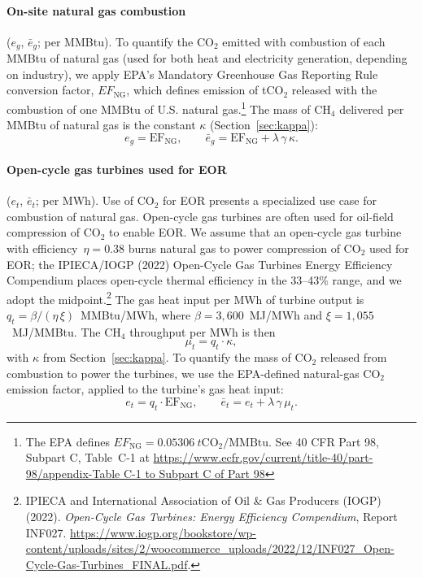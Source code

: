 \documentclass[11pt]{article}
\newcommand{\cotwo}{\ensuremath{\mathrm{CO_2}}}
\newcommand{\chfour}{\ensuremath{\mathrm{CH_4}}}
\begin{document}
\paragraph{On-site natural gas combustion} ($e_g$, $\bar{e}_g$; per MMBtu).
To quantify the \cotwo{} emitted with combustion of each MMBtu of natural gas (used for both heat and electricity generation, depending on industry), we apply EPA's Mandatory Greenhouse Gas Reporting Rule conversion factor, $EF_\text{NG}$, which defines emission of t\cotwo{} released with the combustion of one MMBtu of U.S. natural gas.\footnote{The EPA defines $EF_\text{NG}=0.05306~t\cotwo{}/\text{MMBtu}$. See 40 CFR Part 98, Subpart C, Table~C-1 at \url{https://www.ecfr.gov/current/title-40/part-98/appendix-Table C-1 to Subpart C of Part 98}} The mass of \chfour{} delivered per MMBtu of natural gas is the constant $\kappa$ (Section~\ref{sec:kappa}):
%
\begin{equation}
  e_g = \mathrm{EF}_{\text{NG}}, \qquad
  \bar{e}_g = \mathrm{EF}_{\text{NG}} + \lambda\,\gamma\,\kappa.
  \label{eq:onsite_gas}
\end{equation}

\paragraph{Open-cycle gas turbines used for EOR} ($e_t$, $\bar{e}_t$; per MWh).
Use of \cotwo{} for EOR presents a specialized use case for combustion of natural gas. Open-cycle gas turbines are often used for oil-field compression of \cotwo{} to enable EOR. We assume that an open-cycle gas turbine with efficiency~$\eta = 0.38$ burns natural gas to power compression of \cotwo{} used for EOR; the IPIECA/IOGP (2022) Open-Cycle Gas Turbines Energy Efficiency Compendium places open-cycle thermal efficiency in the 33--43\% range, and we adopt the midpoint.\footnote{IPIECA and International Association of Oil \& Gas Producers (IOGP) (2022). \emph{Open-Cycle Gas Turbines: Energy Efficiency Compendium}, Report INF027. \url{https://www.iogp.org/bookstore/wp-content/uploads/sites/2/woocommerce_uploads/2022/12/INF027_Open-Cycle-Gas-Turbines_FINAL.pdf}.}
The gas heat input per MWh of turbine output is $q_t = \beta / (\eta\,\xi)$~MMBtu/MWh, where $\beta = 3{,}600$~MJ/MWh and $\xi = 1{,}055$~MJ/MMBtu.
The \chfour{} throughput per MWh is then
%
\begin{equation}
  \mu_t = q_t \cdot \kappa,
  \label{eq:turbine_ch4}
\end{equation}
%
with $\kappa$ from Section~\ref{sec:kappa}.
To quantify the mass of \cotwo{} released from combustion to power the turbines, we use the EPA-defined natural-gas \cotwo{} emission factor, applied to the turbine's gas heat input:
%
\begin{equation}
  e_t = q_t \cdot \mathrm{EF}_{\text{NG}}, \qquad
  \bar{e}_t = e_t + \lambda\,\gamma\,\mu_t.
  \label{eq:turbine}
\end{equation}
%
\end{document}
